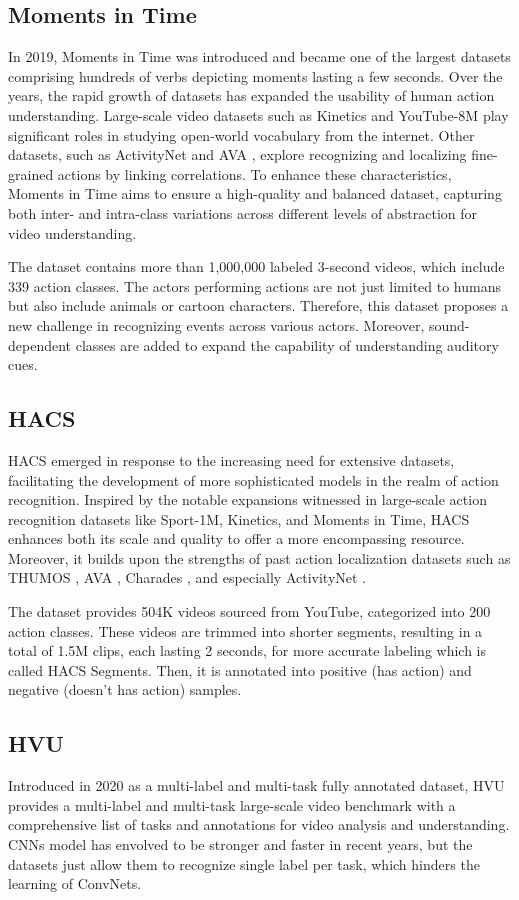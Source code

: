 \documentclass[a4paper]{article}
\begin{document}
\subsection{Moments in Time}
In 2019, Moments in Time \cite{momentsintime} was introduced and became one of the largest datasets comprising hundreds of verbs depicting moments lasting a few seconds. Over the years, the rapid growth of datasets has expanded the usability of human action understanding. Large-scale video datasets such as Kinetics and YouTube-8M \cite{YouTube8M} play significant roles in studying open-world vocabulary from the internet. Other datasets, such as ActivityNet \cite{ActivityNet} and AVA \cite{AVA}, explore recognizing and localizing fine-grained actions by linking correlations. To enhance these characteristics, Moments in Time aims to ensure a high-quality and balanced dataset, capturing both inter- and intra-class variations across different levels of abstraction for video understanding.

The dataset contains more than 1,000,000 labeled 3-second videos, which include 339 action classes. The actors performing actions are not just limited to humans but also include animals or cartoon characters. Therefore, this dataset proposes a new challenge in recognizing events across various actors. Moreover, sound-dependent classes are added to expand the capability of understanding auditory cues.
\subsection{HACS}
HACS \cite{HACS} emerged in response to the increasing need for extensive datasets, facilitating the development of more sophisticated models in the realm of action recognition. Inspired by the notable expansions witnessed in large-scale action recognition datasets like Sport-1M, Kinetics, and Moments in Time, HACS enhances both its scale and quality to offer a more encompassing resource. Moreover, it builds upon the strengths of past action localization datasets such as THUMOS \cite{THUMOS}, AVA \cite{AVA}, Charades \cite{Charades}, and especially ActivityNet \cite{ActivityNet}. 

The dataset provides 504K videos sourced from YouTube, categorized into 200 action classes. These videos are trimmed into shorter segments, resulting in a total of 1.5M clips, each lasting 2 seconds, for more accurate labeling which is called HACS Segments. Then, it is annotated into positive (has action) and negative (doesn't has action) samples.
\subsection{HVU}
Introduced in 2020 as a multi-label and multi-task fully annotated dataset, HVU \cite{HVU} provides a multi-label and multi-task large-scale video benchmark with a comprehensive list of tasks and annotations for video analysis and understanding. CNNs model has envolved to be stronger and faster in recent years, but the datasets just allow them to recognize single label per task, which hinders the learning of ConvNets. 
\end{document}
